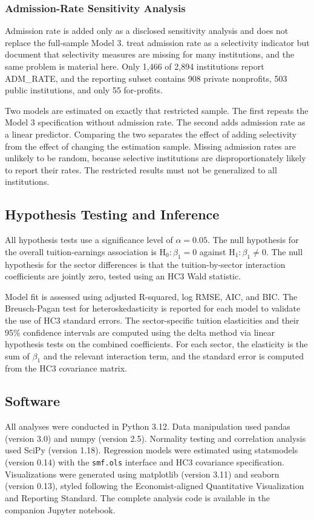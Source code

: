 \subsubsection{Admission-Rate Sensitivity Analysis}

Admission rate is added only as a disclosed sensitivity analysis and does not replace the full-sample Model 3. \textcite[pp.~35--37]{muse2024} treat admission rate as a selectivity indicator but document that selectivity measures are missing for many institutions, and the same problem is material here. Only 1,466 of 2,894 institutions report ADM\_RATE, and the reporting subset contains 908 private nonprofits, 503 public institutions, and only 55 for-profits.

Two models are estimated on exactly that restricted sample. The first repeats the Model 3 specification without admission rate. The second adds admission rate as a linear predictor. Comparing the two separates the effect of adding selectivity from the effect of changing the estimation sample. Missing admission rates are unlikely to be random, because selective institutions are disproportionately likely to report their rates. The restricted results must not be generalized to all institutions.

\subsection{Hypothesis Testing and Inference}

All hypothesis tests use a significance level of $\alpha = 0.05$. The null hypothesis for the overall tuition-earnings association is $\text{H}_0: \beta_1 = 0$ against $\text{H}_1: \beta_1 \neq 0$. The null hypothesis for the sector differences is that the tuition-by-sector interaction coefficients are jointly zero, tested using an HC3 Wald statistic.

Model fit is assessed using adjusted R-squared, log RMSE, AIC, and BIC. The Breusch-Pagan test for heteroskedasticity is reported for each model to validate the use of HC3 standard errors. The sector-specific tuition elasticities and their 95\% confidence intervals are computed using the delta method via linear hypothesis tests on the combined coefficients. For each sector, the elasticity is the sum of $\beta_1$ and the relevant interaction term, and the standard error is computed from the HC3 covariance matrix.

\subsection{Software}

All analyses were conducted in Python 3.12. Data manipulation used pandas (version 3.0) and numpy (version 2.5). Normality testing and correlation analysis used SciPy (version 1.18). Regression models were estimated using statsmodels (version 0.14) with the \texttt{smf.ols} interface and HC3 covariance specification. Visualizations were generated using matplotlib (version 3.11) and seaborn (version 0.13), styled following the Economist-aligned Quantitative Visualization and Reporting Standard. The complete analysis code is available in the companion Jupyter notebook.
